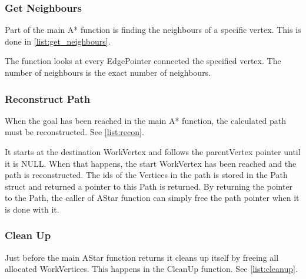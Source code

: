 \subsubsection{Get Neighbours}

Part of the main A* function is finding the neighbours of a specific vertex. This is done in \cref{list:get_neighbours}.

The function looks at every EdgePointer connected the specified vertex. The number of neighbours is the exact number of neighbours.



\subsubsection{Reconstruct Path}

When the goal has been reached in the main A* function, the calculated path must be reconstructed. See \cref{list:recon}.



It starts at the destination WorkVertex and follows the parentVertex pointer until it is NULL. When that happens, the start WorkVertex has been reached and the path is reconstructed. The ids of the Vertices in the path is stored in the Path struct and returned a pointer to this Path is returned. By returning the pointer to the Path, the caller of AStar function can simply free the path pointer when it is done with it.

\subsubsection{Clean Up}


Just before the main AStar function returns it cleans up itself by freeing all allocated WorkVertices. This happens in the CleanUp function. See \cref{list:cleanup}.

